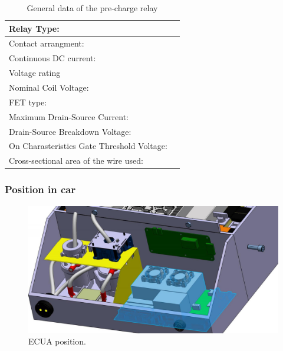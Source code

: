 \begin{table}[H]
	\centering
	\caption{General data of the pre-charge relay}
	\begin{tabularx}{\textwidth}{|X|X|}
		\hline
		Relay Type: & \\[\TableSize]
		\hline
		Contact arrangment: &  \\[\TableSize]
		\hline
		Continuous DC current:  & \\[\TableSize]
		\hline
		Voltage rating  & \\[\TableSize]
		\hline
		Nominal Coil Voltage: &  \\[\TableSize]
		\hline
		FET type: &  \\[\TableSize]
		\hline
		Maximum Drain-Source Current: &  \\[\TableSize]
		\hline
		Drain-Source Breakdown Voltage: &  \\[\TableSize]
		\hline
		On Charasteristics Gate Threshold Voltage: & \\[\TableSize]
		\hline
		Cross-sectional area of the wire used: & \\[\TableSize]
		\hline
	\end{tabularx}%
	\label{tab:precharge-relay}%
\end{table}%

\subsubsection{Position in car}

\begin{figure}[H]
	\centering
	\includegraphics[width=\textwidth]{./img/ECUA_POSITION.jpg}
	\caption{ECUA position.}
	\label{fig:ECUA}
\end{figure}